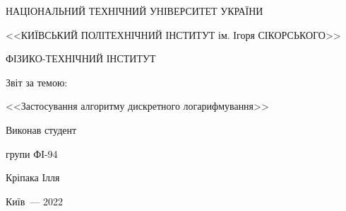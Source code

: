 
	\thispagestyle{empty}
	
	\begin{center}
		НАЦІОНАЛЬНИЙ ТЕХНІЧНИЙ УНІВЕРСИТЕТ УКРАЇНИ \par
		<<КИЇВСЬКИЙ ПОЛІТЕХНІЧНИЙ ІНСТИТУТ ім. Ігоря СІКОРСЬКОГО>>\par
		ФІЗИКО-ТЕХНІЧНИЙ ІНСТИТУТ\par
		
		\vspace{60mm}
		{\huge Звіт за темою:\par
			\LARGE <<Застосування алгоритму дискретного логарифмування>>\par}
		
	\end{center}
	
	\vspace{50mm}
	\begin{flushright}
		Виконав студент
		
		групи ФІ-94
		
		Кріпака Ілля
		
	\end{flushright}
	
	\vspace{30mm}
	\begin{center}
		{Київ~--- 2022}
	\end{center}
	